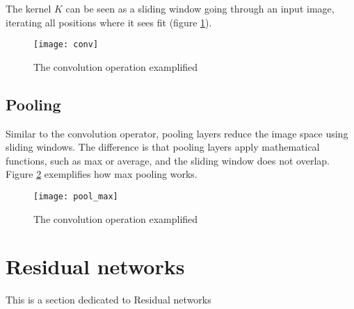 \qquad The kernel $K$ can be seen as a sliding window going through an input image, iterating all positions where it sees fit (figure \ref{fig:conv}).

\begin{figure}[b!]
\centering
\texttt{[image: conv]}
\caption{The convolution operation examplified}
\label{fig:conv}
\end{figure}


\subsection{Pooling}
\label{subsec:obj_cnn_pooling}

\qquad Similar to the convolution operator, pooling layers reduce the image space using sliding windows. The difference is that pooling layers apply mathematical functions, such as max or average, and the sliding window does not overlap. Figure \ref{fig:pool_max} exemplifies how max pooling works.

\begin{figure}[b!]
\centering
\texttt{[image: pool\_max]}
\caption{The convolution operation examplified}
\label{fig:pool_max}
\end{figure}

\section{Residual networks}
\label{sec:obj_resnet}

This is a section dedicated to Residual networks \cite{resnet}